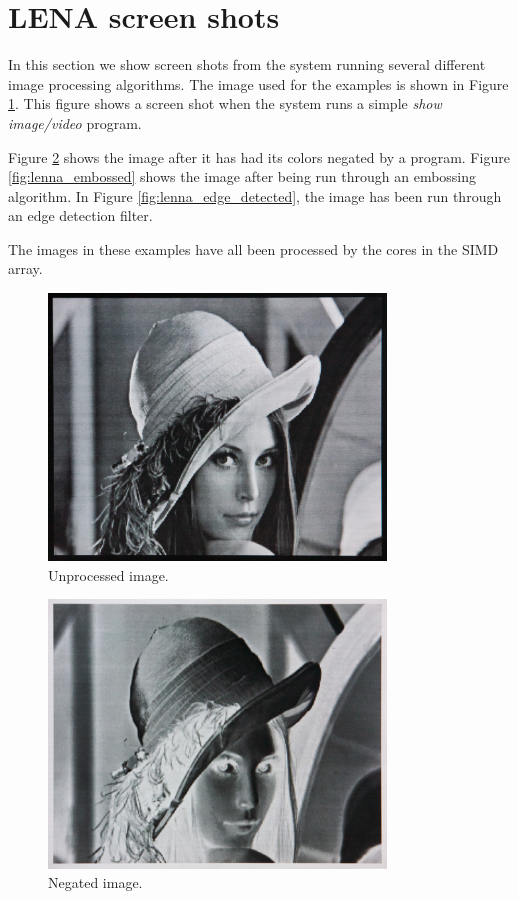\section{LENA screen shots}

In this section we show screen shots from the system running several
different image processing algorithms. The image used for the examples
is shown in Figure \ref{fig:lenna_unprocessed}. This figure shows a
screen shot when the system runs a simple \emph{show image/video}
program.

Figure \ref{fig:lenna_negated} shows the image after it has had its
colors negated by a program. Figure \ref{fig:lenna_embossed} shows the
image after being run through an embossing algorithm. In Figure
\ref{fig:lenna_edge_detected}, the image has been run through an edge
detection filter.

The images in these examples have all been processed by the cores in the
SIMD array.

\begin{figure}[h]
  \centering
  \includegraphics[width=0.8\textwidth]{gfx/results/lenna_unprocessed}
  \caption{Unprocessed image.}
  \label{fig:lenna_unprocessed}
\end{figure}

\begin{figure}[h]
  \centering
  \includegraphics[width=0.8\textwidth]{gfx/results/lenna_negated}
  \caption{Negated image.}
  \label{fig:lenna_negated}
\end{figure}


